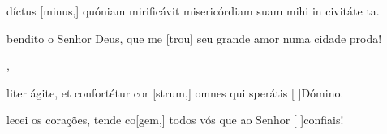 {  {\item {}díctus [minus,] quóniam mirificávit misericórdiam suam mihi in civitáte ta.~\Antiphona}%
    {\item {} bendito o Senhor Deus, que me [trou] seu grande amor numa cidade proda!~\Antiphona},
  {\item {}liter ágite, et confortétur cor [strum,] omnes qui sperátis [ ]{Dó}mino.~\Antiphona}
    {\item {}lecei os corações, tende co[gem,] todos vós que ao Senhor [ ]{con}fiais!~\Antiphona}
}